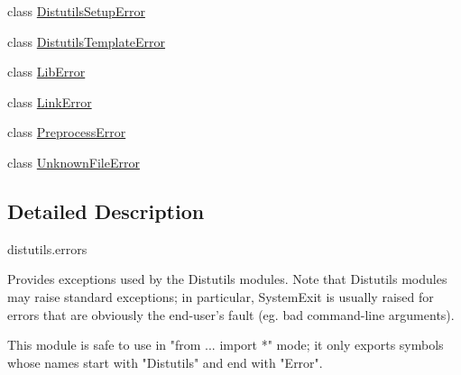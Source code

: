 \begin{DoxyCompactItemize}
\item 
class \hyperlink{classsetuptools_1_1__distutils_1_1errors_1_1DistutilsSetupError}{Distutils\+Setup\+Error}
\item 
class \hyperlink{classsetuptools_1_1__distutils_1_1errors_1_1DistutilsTemplateError}{Distutils\+Template\+Error}
\item 
class \hyperlink{classsetuptools_1_1__distutils_1_1errors_1_1LibError}{Lib\+Error}
\item 
class \hyperlink{classsetuptools_1_1__distutils_1_1errors_1_1LinkError}{Link\+Error}
\item 
class \hyperlink{classsetuptools_1_1__distutils_1_1errors_1_1PreprocessError}{Preprocess\+Error}
\item 
class \hyperlink{classsetuptools_1_1__distutils_1_1errors_1_1UnknownFileError}{Unknown\+File\+Error}
\end{DoxyCompactItemize}


\subsection{Detailed Description}
\begin{DoxyVerb}distutils.errors

Provides exceptions used by the Distutils modules.  Note that Distutils
modules may raise standard exceptions; in particular, SystemExit is
usually raised for errors that are obviously the end-user's fault
(eg. bad command-line arguments).

This module is safe to use in "from ... import *" mode; it only exports
symbols whose names start with "Distutils" and end with "Error".\end{DoxyVerb}
 